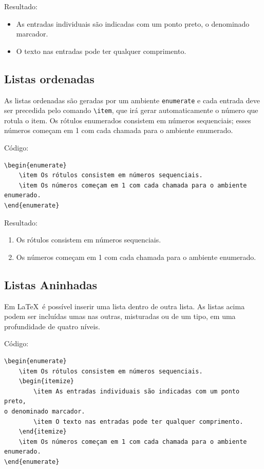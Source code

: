 Resultado:

\begin{itemize}
	\item As entradas individuais são indicadas com um ponto preto, o denominado marcador.
	\item O texto nas entradas pode ter qualquer comprimento.
\end{itemize}

\subsection{Listas ordenadas}

As listas ordenadas são geradas por um ambiente \verb|enumerate| e cada entrada deve ser precedida pelo comando \verb|\item|, que irá gerar automaticamente o número que rotula o item. Os rótulos enumerados consistem em números sequenciais; esses números começam em 1 com cada chamada para o ambiente enumerado.

Código:

\begin{verbatim}
\begin{enumerate}
    \item Os rótulos consistem em números sequenciais.
    \item Os números começam em 1 com cada chamada para o ambiente 
enumerado.
\end{enumerate}
\end{verbatim}

Resultado:

\begin{enumerate}
    \item Os rótulos consistem em números sequenciais.
    \item Os números começam em 1 com cada chamada para o ambiente enumerado.
\end{enumerate}

\subsection{Listas Aninhadas}

Em \LaTeX\ é possível inserir uma lista dentro de outra lista. As listas acima podem ser incluídas umas nas outras, misturadas ou de um tipo, em uma profundidade de quatro níveis.

Código:

\begin{verbatim}
\begin{enumerate}
    \item Os rótulos consistem em números sequenciais.
    \begin{itemize}
        \item As entradas individuais são indicadas com um ponto preto, 
o denominado marcador.
        \item O texto nas entradas pode ter qualquer comprimento.
    \end{itemize}
    \item Os números começam em 1 com cada chamada para o ambiente 
enumerado.
\end{enumerate}
\end{verbatim}

